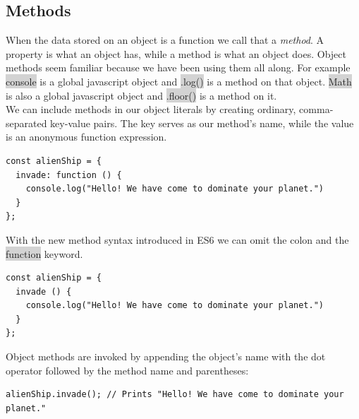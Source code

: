 \documentclass[11pt]{article}
\begin{document}
\subsection{Methods}
When the data stored on an object is a function we call that a \textit{method}. A property is what an object has, while a method is what an object does. Object methods seem familiar because we have been using them all along. For example \colorbox{lightgray}{console} is a global javascript object and \colorbox{lightgray}{.log()} is a method on that object. \colorbox{lightgray}{Math} is also a global javascript object and \colorbox{lightgray}{.floor()} is a method on it. \\
\newline
We can include methods in our object literals by creating ordinary, comma-separated key-value pairs. The key serves as our method’s name, while the value is an anonymous function expression.
\begin{lstlisting}
const alienShip = {
  invade: function () { 
    console.log("Hello! We have come to dominate your planet.")
  }
};
\end{lstlisting}
With the new method syntax introduced in ES6 we can omit the colon and the \colorbox{lightgray}{function} keyword.
\begin{lstlisting}
const alienShip = {
  invade () { 
    console.log("Hello! We have come to dominate your planet.")
  }
};
\end{lstlisting}
Object methods are invoked by appending the object’s name with the dot operator followed by the method name and parentheses:
\begin{lstlisting}
alienShip.invade(); // Prints "Hello! We have come to dominate your planet."
\end{lstlisting}
\end{document}
